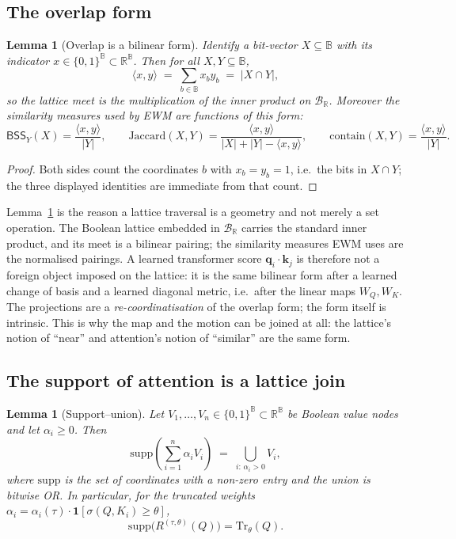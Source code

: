 \documentclass[11pt,a4paper]{article}
\newtheorem{lemma}[principle]{Lemma}
\theoremstyle{remark}
\newcommand{\Plane}{\ensuremath{\mathbb{B}}}          %
\newcommand{\LatR}{\ensuremath{\mathcal{B}_{\mathbb{R}}}} %
\newcommand{\BSS}{\ensuremath{\mathsf{BSS}}}           %
\newcommand{\supp}{\ensuremath{\mathrm{supp}}}         %
\newcommand{\Trv}{\ensuremath{\mathrm{Tr}}}             %
\newcommand{\q}{\ensuremath{\mathbf{q}}}                %
\renewcommand{\k}{\ensuremath{\mathbf{k}}}              %
\newcommand{\sigm}{\ensuremath{\sigma}}                 %
\begin{document}
\subsection{The overlap form}
\label{sec:overlap}

\begin{lemma}[Overlap is a bilinear form]
\label{lem:overlap}
Identify a bit-vector $X\subseteq\Plane$ with its indicator
$x\in\{0,1\}^{\Plane}\subset\mathbb{R}^{\Plane}$. Then for all $X,Y\subseteq\Plane$,
\begin{equation}
  \langle x,y\rangle \;=\;\sum_{b\in\Plane}x_by_b \;=\;|X\cap Y| ,
\end{equation}
so the lattice meet is the multiplication of the inner product on $\LatR$.
Moreover the similarity measures used by EWM are functions of this form:
\[
  \BSS_Y(X)=\frac{\langle x,y\rangle}{|Y|},
  \qquad
  \mathrm{Jaccard}(X,Y)=\frac{\langle x,y\rangle}{|X|+|Y|-\langle x,y\rangle},
  \qquad
  \mathrm{contain}(X,Y)=\frac{\langle x,y\rangle}{|Y|}.
\]
\end{lemma}

\begin{proof}
Both sides count the coordinates $b$ with $x_b=y_b=1$, i.e.\ the bits in
$X\cap Y$; the three displayed identities are immediate from that count.
\end{proof}

Lemma~\ref{lem:overlap} is the reason a lattice traversal is a geometry and not
merely a set operation. The Boolean lattice embedded in $\LatR$ carries the
standard inner product, and its meet is a bilinear pairing; the similarity
measures EWM uses are the normalised pairings. A learned transformer score
$\q_i\!\cdot\!\k_j$ is therefore not a foreign object imposed on the lattice:
it is the same bilinear form after a learned change of basis and a learned
diagonal metric, i.e.\ after the linear maps $W_Q,W_K$. The projections are a
\emph{re-coordinatisation} of the overlap form; the form itself is intrinsic.
This is why the map and the motion can be joined at all: the lattice's notion of
``near'' and attention's notion of ``similar'' are the same form.

\subsection{The support of attention is a lattice join}

\begin{lemma}[Support--union]
\label{lem:support}
Let $V_1,\dots,V_n\in\{0,1\}^{\Plane}\subset\mathbb{R}^{\Plane}$ be Boolean
value nodes and let $\alpha_i\ge 0$. Then
\begin{equation}
  \supp\!\left(\sum_{i=1}^{n}\alpha_i V_i\right)
  \;=\;\bigcup_{i:\,\alpha_i>0} V_i ,
\end{equation}
where $\supp$ is the set of coordinates with a non-zero entry and the union is
bitwise OR. In particular, for the truncated weights
$\alpha_i=\alpha_i(\tau)\cdot\mathbf{1}[\sigm(Q,K_i)\ge\theta]$,
\[
  \supp\bigl(R^{(\tau,\theta)}(Q)\bigr)=\Trv_\theta(Q).
\]
\end{lemma}
\end{document}
